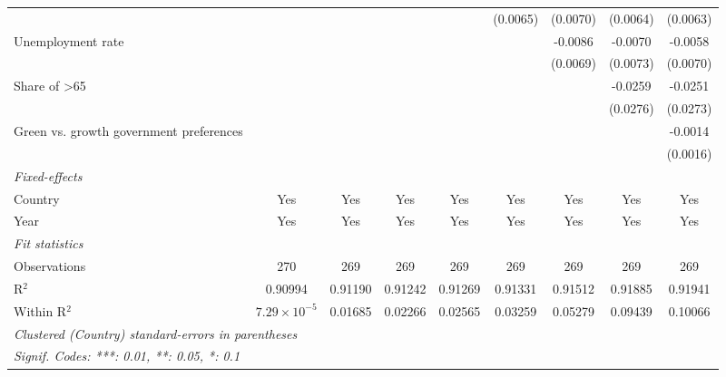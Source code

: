 \begin{table}[htbp]
\begin{tabular}{lcccccccc}
                                                                              &                       &          &          &          & (0.0065) & (0.0070) & (0.0064)      & (0.0063)\\   
      Unemployment rate                                                       &                       &          &          &          &          & -0.0086  & -0.0070       & -0.0058\\   
                                                                              &                       &          &          &          &          & (0.0069) & (0.0073)      & (0.0070)\\   
      Share of >65                                                            &                       &          &          &          &          &          & -0.0259       & -0.0251\\   
                                                                              &                       &          &          &          &          &          & (0.0276)      & (0.0273)\\   
      Green vs. growth government preferences                                 &                       &          &          &          &          &          &               & -0.0014\\   
                                                                              &                       &          &          &          &          &          &               & (0.0016)\\   
      \midrule
      \emph{Fixed-effects}\\
      Country                                                                 & Yes                   & Yes      & Yes      & Yes      & Yes      & Yes      & Yes           & Yes\\  
      Year                                                                    & Yes                   & Yes      & Yes      & Yes      & Yes      & Yes      & Yes           & Yes\\  
      \midrule
      \emph{Fit statistics}\\
      Observations                                                            & 270                   & 269      & 269      & 269      & 269      & 269      & 269           & 269\\  
      R$^2$                                                                   & 0.90994               & 0.91190  & 0.91242  & 0.91269  & 0.91331  & 0.91512  & 0.91885       & 0.91941\\  
      Within R$^2$                                                            & $7.29\times 10^{-5}$  & 0.01685  & 0.02266  & 0.02565  & 0.03259  & 0.05279  & 0.09439       & 0.10066\\  
      \midrule \midrule
      \multicolumn{9}{l}{\emph{Clustered (Country) standard-errors in parentheses}}\\
      \multicolumn{9}{l}{\emph{Signif. Codes: ***: 0.01, **: 0.05, *: 0.1}}\\
   \end{tabular}
\end{table}


